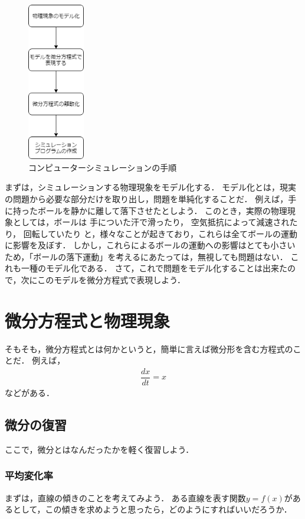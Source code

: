 \begin{figure}
	\centering
    \includegraphics[width=2.5cm]{img/numerical-analysis-flow.png}
    \caption{コンピューターシミュレーションの手順}
    \label{numerical-analysis-flow}
\end{figure}


まずは，シミュレーションする物理現象をモデル化する．
モデル化とは，現実の問題から必要な部分だけを取り出し，問題を単純化することだ．
例えば，手に持ったボールを静かに離して落下させたとしよう．
このとき，実際の物理現象としては，ボールは
手についた汗で滑ったり，
空気抵抗によって減速されたり，
回転していたり
と，様々なことが起きており，これらは全てボールの運動に影響を及ぼす．
しかし，これらによるボールの運動への影響はとても小さいため，「ボールの落下運動」を考えるにあたっては，無視しても問題はない．
これも一種のモデル化である．
さて，これで問題をモデル化することは出来たので，次にこのモデルを微分方程式で表現しよう．

\section{微分方程式と物理現象}
そもそも，微分方程式とは何かというと，簡単に言えば微分形を含む方程式のことだ．
例えば，
\begin{align}
	\dfrac{dx}{dt} = x
\end{align}
などがある．

\subsection{微分の復習}
ここで，微分とはなんだったかを軽く復習しよう．
\subsubsection{平均変化率}
まずは，直線の傾きのことを考えてみよう．
ある直線を表す関数$y=f(x)$があるとして，この傾きを求めようと思ったら，どのようにすればいいだろうか．

